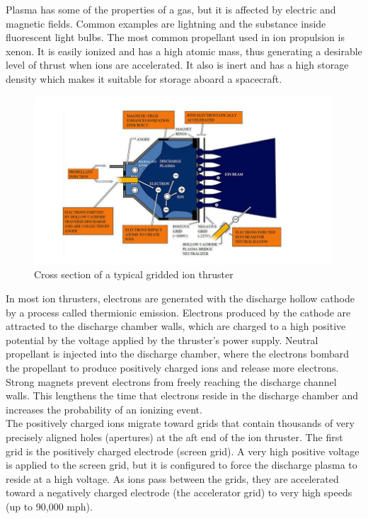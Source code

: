 \documentclass[11pt]{article}
\begin{document}
Plasma has some of the properties of a gas, but it is affected by electric and magnetic fields. Common examples are lightning and the substance inside fluorescent light bulbs. The most common propellant used in ion propulsion is xenon. It is easily ionized and has a high atomic mass, thus generating a desirable level of thrust when ions are accelerated. It also is inert and has a high storage density which makes it suitable for storage aboard a spacecraft.\\

\begin{figure}[h!]
\centering
\includegraphics[width= \textwidth]{ion_thrust}
\caption{\label{fig:ion_thrust} Cross section of a typical gridded ion thruster \cite{ionthruster}}
\end{figure}

In most ion thrusters, electrons are generated with the discharge hollow cathode by a process called thermionic emission. Electrons produced by the cathode are attracted to the discharge chamber walls, which are charged to a high positive potential by the voltage applied by the thruster’s power supply. Neutral propellant is injected into the discharge chamber, where the electrons bombard the propellant to produce positively charged ions and release more electrons. Strong magnets prevent electrons from freely reaching the discharge channel walls. This lengthens the time that electrons reside in the discharge chamber and increases the probability of an ionizing event.\\

The positively charged ions migrate toward grids that contain thousands of very precisely aligned holes (apertures) at the aft end of the ion thruster. The first grid is the positively charged electrode (screen grid). A very high positive voltage is applied to the screen grid, but it is configured to force the discharge plasma to reside at a high voltage. As ions pass between the grids, they are accelerated toward a negatively charged electrode (the accelerator grid) to very high speeds (up to 90,000 mph).\\
\end{document}
